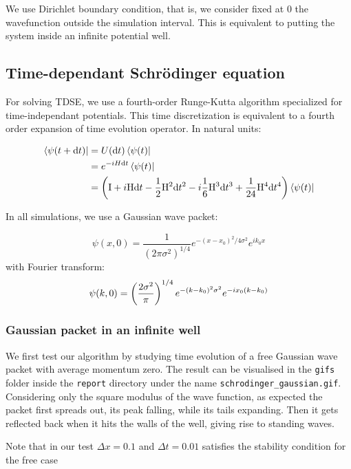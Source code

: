\documentclass[a4paper,11]{article}
\newcommand{\mdcode}[1]{\lstinline[backgroundcolor=\color{gray!10}, frame=single, frameround=tttt]|#1|}
\newcommand{\df}{\mathrm{d}}
\begin{document}
We use Dirichlet boundary condition, that is, we consider fixed at 0 the 
wavefunction outside the simulation interval. This is equivalent to putting 
the system inside an infinite potential well.

\subsection{Time-dependant Schrödinger equation}

For solving TDSE, we use a fourth-order
Runge-Kutta algorithm specialized for time-independant potentials. 
This time discretization is equivalent to a fourth order expansion of time 
evolution operator. In natural units:

\newcommand{\ham}{\mathrm{H}}

\begin{alignat*}{2}
	\bra{\psi(t+\df t)} &= U( \df t) \bra{\psi(t)} \\
	&= e^{-iH \df t} \bra{\psi(t)} \\
	&=\left( \mathrm I +  i\ham\df t - \frac{1}{2}\ham^{2} \df t^{2} 
	- i \frac{1}{6}\ham^{3}\df t^{3} + \frac{1}{24}\ham^{4} \df t^{4}
	 \right)\bra{\psi(t)}
\end{alignat*}

In all simulations, we use a Gaussian wave packet:

\[
    \psi(x,0) = \frac{1}{(2\pi\sigma^2)^{1/4}} e^{-(x-x_0)^2/4\sigma^2}e^{ik_0x}
\]
with Fourier transform:
\[
    \psi(k,0) = \left(2\sigma^2\over \pi\right)^{1/4}
    e^{-(k-k_0)^2\sigma^2}e^{-ix_0(k-k_0)}
\]

\subsubsection{Gaussian packet in an infinite well}

We first test our algorithm by studying time evolution of a free Gaussian wave 
packet with average momentum zero. The result can be visualised in the 
\mdcode{gifs} folder inside the \mdcode{report} directory under the name
\mdcode{schrodinger_gaussian.gif}.
Considering only the square modulus of the wave function,
as expected the packet first spreads out, its peak falling, while its 
tails expanding. Then it gets reflected back when it hits the walls of the well,
giving rise to standing waves.

Note that in our test $\Delta x = 0.1$ and $\Delta t = 0.01$ satisfies 
the stability condition for the free case
\end{document}
